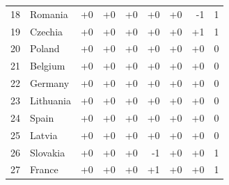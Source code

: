 \begin{landscape}
\begin{longtable}{@{}rl rrrrrr r@{}}
  18 & Romania & +0 & +0 & +0 & +0 & +0 & -1 & 1 \\
  19 & Czechia & +0 & +0 & +0 & +0 & +0 & +1 & 1 \\
  20 & Poland & +0 & +0 & +0 & +0 & +0 & +0 & 0 \\
  21 & Belgium & +0 & +0 & +0 & +0 & +0 & +0 & 0 \\
  22 & Germany & +0 & +0 & +0 & +0 & +0 & +0 & 0 \\
  23 & Lithuania & +0 & +0 & +0 & +0 & +0 & +0 & 0 \\
  24 & Spain & +0 & +0 & +0 & +0 & +0 & +0 & 0 \\
  25 & Latvia & +0 & +0 & +0 & +0 & +0 & +0 & 0 \\
  26 & Slovakia & +0 & +0 & +0 & -1 & +0 & +0 & 1 \\
  27 & France & +0 & +0 & +0 & +1 & +0 & +0 & 1 \\
\end{longtable}
\end{landscape}